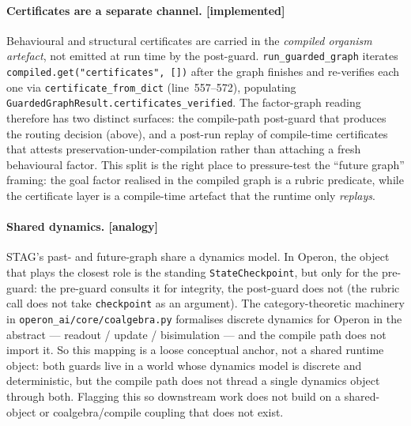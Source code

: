 \paragraph{Certificates are a separate channel. [implemented]}
Behavioural and structural certificates are carried in the
\emph{compiled organism artefact}, not emitted at run time by the
post-guard.  \texttt{run\_guarded\_graph} iterates
\texttt{compiled.get("certificates", [])} after the graph finishes
and re-verifies each one via
\texttt{certificate\_from\_dict} (line~557--572), populating
\texttt{GuardedGraphResult.certificates\_verified}.  The
factor-graph reading therefore has two distinct surfaces: the
compile-path post-guard that produces the routing decision (above),
and a post-run replay of compile-time certificates that attests
preservation-under-compilation rather than attaching a fresh
behavioural factor.  This split is the right place to pressure-test
the ``future graph'' framing: the goal factor realised in the
compiled graph is a rubric predicate, while the certificate layer
is a compile-time artefact that the runtime only \emph{replays}.

\paragraph{Shared dynamics. [analogy]}
STAG's past- and future-graph share a dynamics model.  In Operon,
the object that plays the closest role is the standing
\texttt{StateCheckpoint}, but only for the pre-guard: the pre-guard
consults it for integrity, the post-guard does not (the rubric call
does not take \texttt{checkpoint} as an argument).  The
category-theoretic machinery in
\texttt{operon\_ai/core/coalgebra.py} formalises discrete dynamics
for Operon in the abstract --- readout / update / bisimulation ---
and the compile path does not import it.  So this mapping is a
loose conceptual anchor, not a shared runtime object: both guards
live in a world whose dynamics model is discrete and deterministic,
but the compile path does not thread a single dynamics object
through both.  Flagging this so downstream work does not build on a
shared-object or coalgebra/compile coupling that does not exist.

